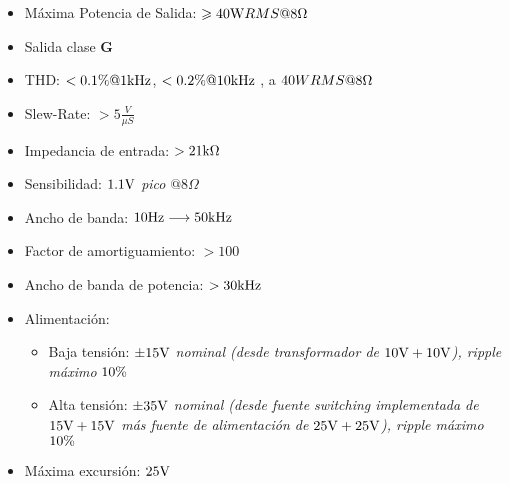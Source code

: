 \begin{itemize}
	\item Máxima Potencia de Salida:  $\geqslant 40\si[per-mode=symbol]{\watt} RMS @8\si[per-mode=symbol]{\ohm}$
	\item Salida clase \textbf{G}
	\item THD: $< 0.1 \si[per-mode=symbol]{\percent} @ 1\si[per-mode=symbol]{\kilo\hertz}$, $<0.2 \si[per-mode=symbol]{\percent} @ 10\si[per-mode=symbol]{\kilo\hertz}$ , a $40W RMS@8\si[per-mode=symbol]{\ohm}$
	\item Slew-Rate: $>5\frac{V}{\mu S}$
	\item Impedancia de entrada: $>21\si[per-mode=symbol]{\kilo\ohm}$
	\item Sensibilidad: $1.1\si[per-mode=symbol]{\volt}$ \textit{pico} $@8\Omega$
	\item Ancho de banda: $10\si[per-mode=symbol]{\hertz} \longrightarrow  50\si[per-mode=symbol]{\kilo\hertz}$
	\item Factor de amortiguamiento: $>100$
	\item Ancho de banda de potencia: $>30\si[per-mode=symbol]{\kilo\hertz}$
	\item Alimentación: 
	\begin{itemize}
		\item Baja tensión: $ \pm 15\si[per-mode=symbol]{\volt}$ \textit{nominal (desde transformador de $ 10 \si[per-mode=symbol]{\volt} +10 \si[per-mode=symbol]{\volt}$), ripple máximo} $10 \si[per-mode=symbol]{\percent}$
		\item Alta tensión: $ \pm 35\si[per-mode=symbol]{\volt}$ \textit{nominal (desde fuente switching implementada de $ 15 \si[per-mode=symbol]{\volt} +15 \si[per-mode=symbol]{\volt}$ más fuente de alimentación de $ 25 \si[per-mode=symbol]{\volt} +25 \si[per-mode=symbol]{\volt}$), ripple máximo} $10 \si[per-mode=symbol]{\percent}$
	\end{itemize}
	
	\item Máxima excursión: $25\si[per-mode=symbol]{\volt}$
\end{itemize}



 
 

